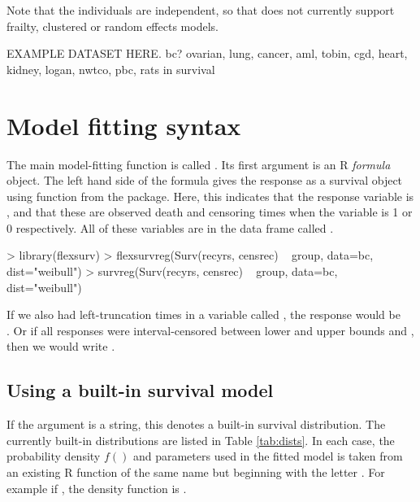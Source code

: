 \documentclass[nojss,nofooter]{jss}
\begin{document}
Note that the individuals are independent, so that  does not
currently support frailty, clustered or random effects models.

EXAMPLE DATASET HERE.  bc?  ovarian, lung, cancer, aml, tobin, cgd,
heart, kidney, logan, nwtco, pbc, rats in survival


\section{Model fitting syntax} 

The main model-fitting function is called .  Its
first argument is an R \emph{formula} object.  The left hand side of
the formula gives the response as a survival object using 
function from the  package.  Here, this indicates that
the response variable is , and that these are observed
death and censoring times when the variable  is 1 or 0
respectively.  All of these variables are in the data frame called
.  
\begin{Schunk}
\begin{Sinput}
> library(flexsurv)
> flexsurvreg(Surv(recyrs, censrec) ~ group, data=bc, dist="weibull")
> survreg(Surv(recyrs, censrec) ~ group, data=bc, dist="weibull")
\end{Sinput}
\end{Schunk}

If we also had left-truncation times in a variable called
, the response would be \\ .
Or if all responses were interval-censored between lower and upper
bounds  and , then we would write
.



\subsection{Using a built-in survival model}

If the argument  is a string, this denotes a built-in
survival distribution.  The currently built-in distributions are
listed in Table \ref{tab:dists}.  In each case, the probability
density $f()$ and parameters used in the fitted model is taken from an
existing R function of the same name but beginning with the letter
.  For example if , the density function
is .
\end{document}
